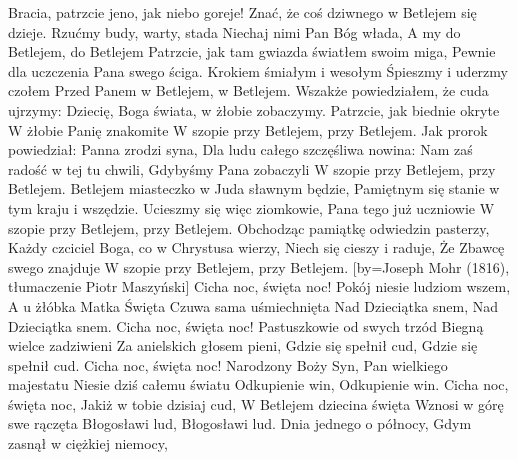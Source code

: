 \beginverse
    Bracia, patrzcie jeno, jak niebo goreje!
    Znać, że coś dziwnego w Betlejem się dzieje.
    Rzućmy budy, warty, stada
    Niechaj nimi Pan Bóg włada,
    A my do Betlejem, do Betlejem 
\endverse
\beginverse
    Patrzcie, jak tam gwiazda światłem swoim miga,
    Pewnie dla uczczenia Pana swego ściga.
    Krokiem śmiałym i wesołym
    Śpieszmy i uderzmy czołem
    Przed Panem w Betlejem, w Betlejem.
\endverse
\beginverse
    Wszakże powiedziałem, że cuda ujrzymy:
    Dziecię, Boga świata, w żłobie zobaczymy.
    Patrzcie, jak biednie okryte
    W żłobie Panię znakomite
    W szopie przy Betlejem, przy Betlejem.
\endverse
\beginverse
    Jak prorok powiedział: Panna zrodzi syna,
    Dla ludu całego szczęśliwa nowina:
    Nam zaś radość w tej tu chwili,
    Gdybyśmy Pana zobaczyli
    W szopie przy Betlejem, przy Betlejem.
\endverse
\beginverse
    Betlejem miasteczko w Juda sławnym będzie,
    Pamiętnym się stanie w tym kraju i wszędzie.
    Ucieszmy się więc ziomkowie,
    Pana tego już uczniowie
    W szopie przy Betlejem, przy Betlejem.
\endverse
\beginverse
    Obchodząc pamiątkę odwiedzin pasterzy,
    Każdy czciciel Boga, co w Chrystusa wierzy,
    Niech się cieszy i raduje,
    Że Zbawcę swego znajduje
    W szopie przy Betlejem, przy Betlejem.
\endverse
\endsong
[by={Joseph Mohr (1816), tłumaczenie Piotr Maszyński}]
\beginverse
    Cicha noc, święta noc!
    Pokój niesie ludziom wszem,
    A u żłóbka Matka Święta
    Czuwa sama uśmiechnięta
    Nad Dzieciątka snem,
    Nad Dzieciątka snem.
\endverse
\beginverse
    Cicha noc, święta noc!
    Pastuszkowie od swych trzód
    Biegną wielce zadziwieni
    Za anielskich głosem pieni,
    Gdzie się spełnił cud,
    Gdzie się spełnił cud.
\endverse
\beginverse
    Cicha noc, święta noc!
    Narodzony Boży Syn,
    Pan wielkiego majestatu
    Niesie dziś całemu światu
    Odkupienie win,
    Odkupienie win.
\endverse
\beginverse
    Cicha noc, święta noc,
    Jakiż w tobie dzisiaj cud,
    W Betlejem dziecina święta
    Wznosi w górę swe rączęta
    Błogosławi lud,
    Błogosławi lud.
\endverse
\endsong
\beginverse
    Dnia jednego o północy,
    Gdym zasnął w ciężkiej niemocy,
\endverse
  \beginchorus
